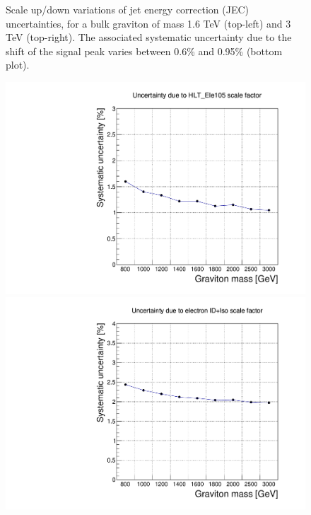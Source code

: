 \begin{figure}[hb!]
\begin{center}
\caption[Uncertainties due to jet energy correction]{Scale up/down variations of jet energy correction (JEC) uncertainties, for a bulk graviton of mass 1.6 TeV (top-left) and 3 TeV (top-right). The associated systematic uncertainty due to the shift of the signal peak varies between 0.6\% and 0.95\% (bottom plot). }
\label{fig:jecUnc}
\end{center}
\end{figure}

\begin{figure}[h]
\begin{center}
\includegraphics[scale=0.33]{figures/systematics/hltEleSFunc.pdf}
\includegraphics[scale=0.33]{figures/systematics/IDIsoEleSFunc.pdf}\\

\end{center}
\end{figure}
